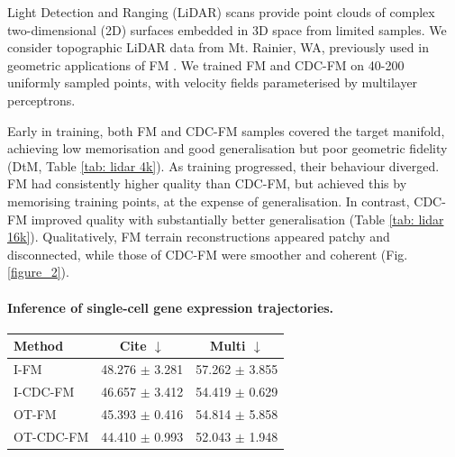 \documentclass{article} %
\begin{document}
Light Detection and Ranging (LiDAR) scans provide point clouds of complex two-dimensional (2D) surfaces embedded in 3D space from limited samples.
We consider topographic LiDAR data from Mt. Rainier, WA, previously used in geometric applications of FM \citep{liu2024gsbm, kapusniak2024metric}.
We trained FM and CDC-FM on 40-200 uniformly sampled points, with velocity fields parameterised by multilayer perceptrons.

Early in training, both FM and CDC-FM samples covered the target manifold, achieving low memorisation and good generalisation but poor geometric fidelity (DtM, Table \ref{tab: lidar 4k}). 
As training progressed, their behaviour diverged. FM had consistently higher quality than CDC-FM, but achieved this by memorising training points, at the expense of generalisation. In contrast, CDC-FM improved quality with substantially better generalisation (Table \ref{tab: lidar 16k}). 
Qualitatively, FM terrain reconstructions appeared patchy and disconnected, while those of CDC-FM were smoother and coherent (Fig. \ref{figure_2}). 

\paragraph{Inference of single-cell gene expression trajectories.}\label{section:singlecell}


\begin{table}
    \centering
    \vspace{-0.7em} 
    {\scriptsize
    \begin{tabular}{lcc}
    \toprule
    \textbf{Method}  & \textbf{Cite} $\downarrow$ & \textbf{Multi} $\downarrow$ \\ \midrule
    I-FM              & 48.276 \(\pm\) 3.281 & 57.262 \(\pm\) 3.855 \\
    I-CDC-FM          & 46.657 \(\pm\) 3.412 & 54.419 \(\pm\) 0.629 \\
    \midrule
    OT-FM             & 45.393 \(\pm\) 0.416 & 54.814 \(\pm\) 5.858 \\
    OT-CDC-FM         & 44.410 \(\pm\) 0.993 & 52.043 \(\pm\) 1.948 \\
    \bottomrule
    \end{tabular}
    }
    \vspace{-1.5 em} 
    \label{tab:single_cell}
\end{table}
\end{document}
